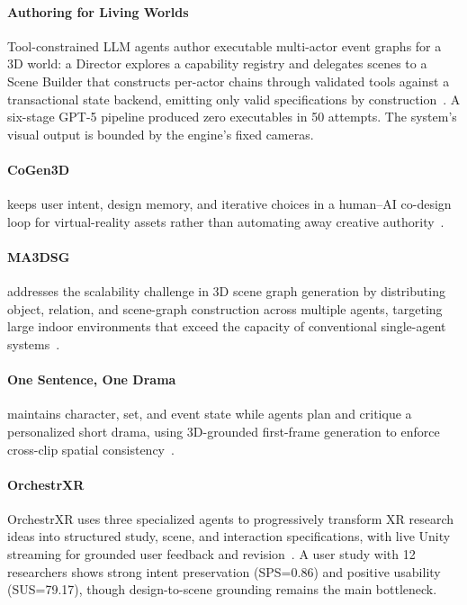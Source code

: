 \paragraph{Authoring for Living Worlds}
Tool-constrained LLM agents author executable multi-actor event graphs for a 3D world: a Director explores a capability registry and delegates scenes to a Scene Builder that constructs per-actor chains through validated tools against a transactional state backend, emitting only valid specifications by construction~\cite{avg260410383}. A six-stage GPT-5 pipeline produced zero executables in 50 attempts. The system's visual output is bounded by the engine's fixed cameras.

\paragraph{CoGen3D} keeps user intent, design memory, and iterative choices in a human--AI co-design loop for virtual-reality assets rather than automating away creative authority~\cite{avg260703731}.

\paragraph{MA3DSG} addresses the scalability challenge in 3D scene graph generation by distributing object, relation, and scene-graph construction across multiple agents, targeting large indoor environments that exceed the capacity of conventional single-agent systems~\cite{avg260204152}.

\paragraph{One Sentence, One Drama} maintains character, set, and event state while agents plan and critique a personalized short drama, using 3D-grounded first-frame generation to enforce cross-clip spatial consistency~\cite{avg260522144}.

\paragraph{OrchestrXR}
OrchestrXR uses three specialized agents to progressively transform XR research ideas into structured study, scene, and interaction specifications, with live Unity streaming for grounded user feedback and revision~\cite{avg260701588}. A user study with 12 researchers shows strong intent preservation (SPS=0.86) and positive usability (SUS=79.17), though design-to-scene grounding remains the main bottleneck. 

